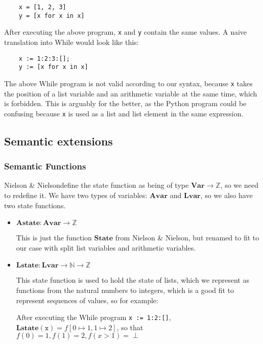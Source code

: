 \documentclass[12pt]{article}
\newcommand\mono\texttt
\newcommand{\Ntwo}{Nielson \& Nielson}
\newcommand{\Var}{\mathbf{Var}}
\newcommand{\Avar}{\mathbf{Avar}}
\newcommand{\Lvar}{\mathbf{Lvar}}
\newcommand{\State}{\mathbf{State}}
\newcommand{\Astate}{\mathbf{Astate}}
\newcommand{\Lstate}{\mathbf{Lstate}}
\begin{document}
\begin{lstlisting}
    x = [1, 2, 3]
    y = [x for x in x]
\end{lstlisting}

After executing the above program, \mono{x} and \mono{y} contain the same values. A naive translation into While would look like this:

\begin{lstlisting}
    x := 1:2:3:[];
    y := [x for x in x]
\end{lstlisting}

The above While program is not valid according to our syntax, because \mono{x} takes the position of a list variable and an arithmetic variable at the same time, which is forbidden. This is arguably for the better, as the Python program could be confusing because \mono{x} is used as a list and list element in the same expression.

\subsection{Semantic extensions}

\subsubsection{Semantic Functions}

\Ntwo define the state function as being of type $\Var \rightarrow \mathbb{Z}$, so we need to redefine it. We have two types of variables: $\Avar$ and $\Lvar$, so we also have two state functions.

\begin{itemize}
    \item $\Astate: \Avar \rightarrow \mathbb{Z}$

    This is just the function $\State$ from \Ntwo \cite{wiley}, but renamed to fit to our case with split list variables and arithmetic variables.
    \item $\Lstate: \Lvar \rightarrow \mathbb{N} \rightarrow \mathbb{Z}$

    This state function is used to hold the state of lists, which we represent as functions from the natural numbers to integers, which is a good fit to represent sequences of values, so for example:

    After executing the While program \mono{x := 1:2:[]}, $\Lstate(\mono{x}) = f[0 \mapsto 1, 1 \mapsto 2]$, so that $f(0) = 1, f(1) = 2, f(x > 1) = \perp$
\end{itemize}
\end{document}
